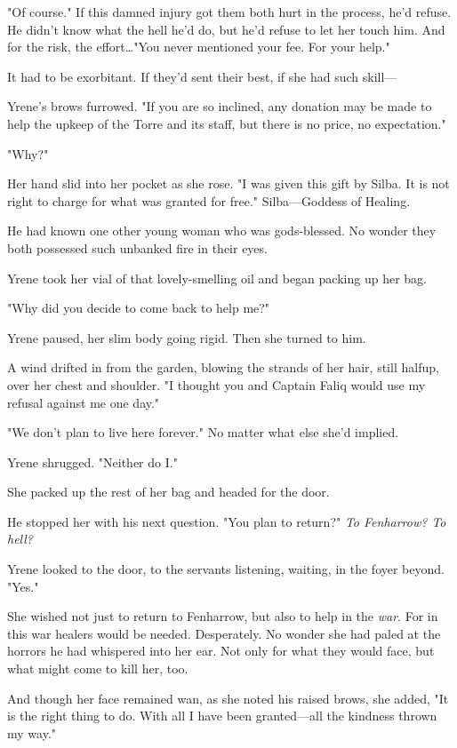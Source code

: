 "Of course."
If this damned injury got them both hurt in the process, he'd refuse.
He didn't know what the hell he'd do, but he'd refuse to let her touch him.
And for the risk, the effort\ldots "You never mentioned your fee.
For your help."

It had to be exorbitant.
If they'd sent their best, if she had such skill---

Yrene's brows furrowed.
"If you are so inclined, any donation may be made to help the upkeep of the Torre and its staff, but there is no price, no expectation."

"Why?"

Her hand slid into her pocket as she rose.
"I was given this gift by Silba.
It is not right to charge for what was granted for free."
Silba---Goddess of Healing.

He had known one other young woman who was gods-blessed.
No wonder they both possessed such unbanked fire in their eyes.

Yrene took her vial of that lovely-smelling oil and began packing up her bag.

"Why did you decide to come back to help me?"

Yrene paused, her slim body going rigid.
Then she turned to him.

A wind drifted in from the garden, blowing the strands of her hair, still halfup, over her chest and shoulder.
"I thought you and Captain Faliq would use my refusal against me one day."

"We don't plan to live here forever."
No matter what else she'd implied.

Yrene shrugged.
"Neither do I."

She packed up the rest of her bag and headed for the door.

He stopped her with his next question.
"You plan to return?"
\emph{To Fenharrow?
To hell?}

Yrene looked to the door, to the servants listening, waiting, in the foyer beyond.
"Yes."

She wished not just to return to Fenharrow, but also to help in the \emph{war}.
For in this war healers would be needed.
Desperately.
No wonder she had paled at the horrors he had whispered into her ear.
Not only for what they would face, but what might come to kill her, too.

And though her face remained wan, as she noted his raised brows, she added, "It is the right thing to do.
With all I have been granted---all the kindness thrown my way."

